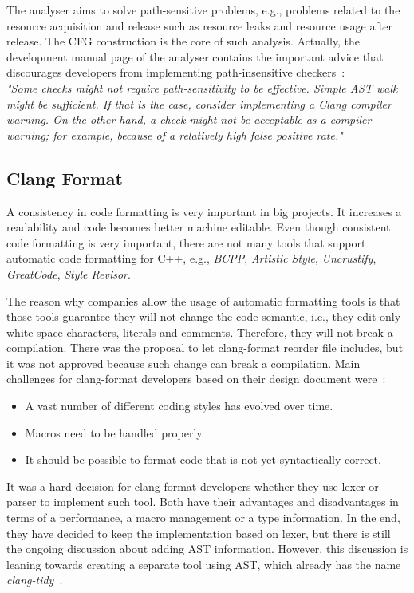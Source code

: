 The analyser aims to solve path-sensitive problems, e.g., problems related to the resource acquisition and release such as resource leaks and resource usage after release. The CFG construction is the core of such analysis. Actually, the development manual page of the analyser contains the important advice that discourages developers from implementing path-insensitive checkers~\cite{clang-analyzer-manual}:\\

\label{clang-analyzer-checkers}
\emph{"Some checks might not require path-sensitivity to be effective. Simple AST walk might be sufficient. If that is the case, consider implementing a Clang compiler warning. On the other hand, a check might not be acceptable as a compiler warning; for example, because of a relatively high false positive rate."}

\subsection{Clang Format}
\label{clang-format}
A consistency in code formatting is very important in big projects. It increases a readability and code becomes better machine editable. Even though consistent code formatting is very important, there are not many tools that support automatic code formatting for C++, e.g., \emph{BCPP}, \emph{Artistic Style}, \emph{Uncrustify}, \emph{GreatCode}, \emph{Style Revisor}.

The reason why companies allow the usage of automatic formatting tools is that those tools guarantee they will not change the code semantic, i.e., they edit only white space characters, literals and comments. Therefore, they will not break a compilation. There was the proposal to let clang-format reorder file includes, but it was not approved because such change can break a compilation. Main challenges for clang-format developers based on their design document were~\cite{clang-format-design}:

\begin{itemize}
\item A vast number of different coding styles has evolved over time.
\item Macros need to be handled properly.
\item It should be possible to format code that is not yet syntactically correct.
\end{itemize}

It was a hard decision for clang-format developers whether they use lexer or parser to implement such tool. Both have their advantages and disadvantages in terms of a performance, a macro management or a type information. In the end, they have decided to keep the implementation based on lexer, but there is still the ongoing discussion about adding AST information. However, this discussion is leaning towards creating a separate tool using AST, which already has the name \emph{clang-tidy}~\cite{clang-tidy}.

